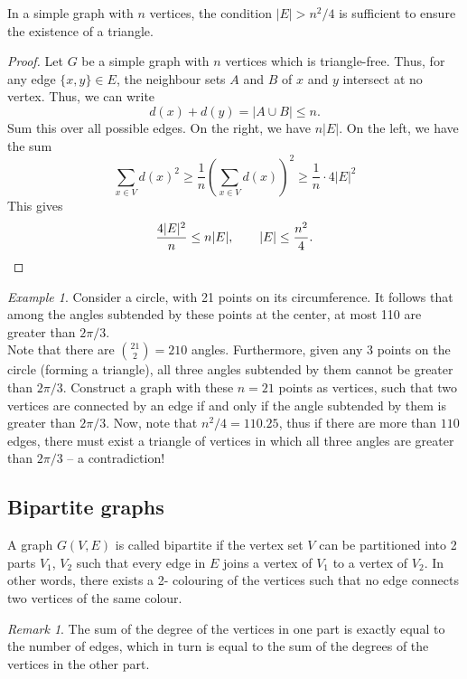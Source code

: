 \documentclass[11pt]{article}
\theoremstyle{definition}
\theoremstyle{remark}
\newtheorem*{remark}{Remark}
\newtheorem*{example}{Example}
\numberwithin{equation}{section}
\begin{document}
    \begin{theorem}[Mantel]
        In a simple graph with $n$ vertices, the condition $|E| > n^2 / 4$ is
        sufficient to ensure the existence of a triangle.
    \end{theorem}
    \begin{proof}
        Let $G$ be a simple graph with $n$ vertices which is triangle-free. Thus, for
        any edge $\{x, y\} \in E$, the neighbour sets $A$ and $B$ of $x$ and $y$
        intersect at no vertex. Thus, we can write \[
            d(x) + d(y) = |A \cup B| \leq n.
        \] Sum this over all possible edges. On the right, we have $n|E|$. On the
        left, we have the sum \[
            \sum_{x \in V} d(x)^2 \geq \frac{1}{n} \left(\sum_{x \in V} d(x)\right)^2
            \geq \frac{1}{n} \cdot 4|E|^2
        \] This gives \[
            \frac{4|E|^2}{n} \leq n |E|, \qquad |E| \leq \frac{n^2}{4}. \qedhere
        \] 
    \end{proof}
    \begin{example}
        Consider a circle, with 21 points on its circumference. It follows that among
        the angles subtended by these points at the center, at most 110 are greater
        than $2\pi / 3$. \\

        Note that there are $\binom{21}{2} = 210$ angles. Furthermore, given any 3
        points on the circle (forming a triangle), all three angles subtended by them
        cannot be greater than $2\pi / 3$. Construct a graph with these $n = 21$
        points as vertices, such that two vertices are connected by an edge if and
        only if the angle subtended by them is greater than $2\pi / 3$.  Now, note
        that $n^2 / 4 = 110.25$, thus if there are more than $110$ edges, there must
        exist a triangle of vertices in which all three angles are greater than $2\pi
        / 3$ -- a contradiction!
    \end{example}

    \subsection{Bipartite graphs}
    \begin{definition}
        A graph $G(V, E)$ is called bipartite if the vertex set $V$ can be
        partitioned into 2 parts $V_1$, $V_2$ such that every edge in $E$ joins a
        vertex of $V_1$ to a vertex of $V_2$. In other words, there exists a 2-
        colouring of the vertices such that no edge connects two vertices of the same
        colour.

        \begin{remark}
            The sum of the degree of the vertices in one part is exactly equal to
            the number of edges, which in turn is equal to the sum of the degrees of
            the vertices in the other part.
        \end{remark}
    \end{definition}
\end{document}
